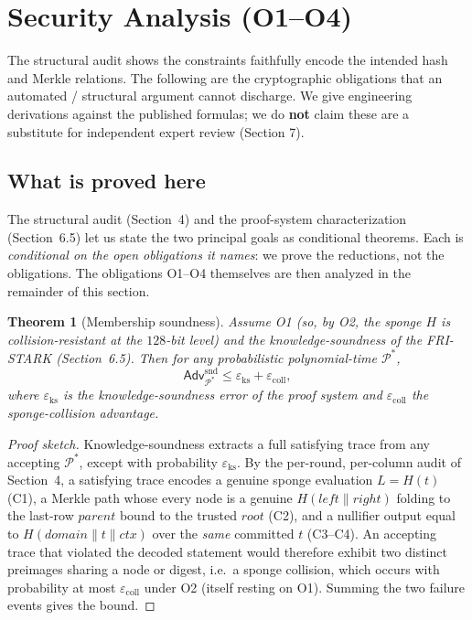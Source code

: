 \documentclass[11pt]{article}
\newcommand{\cat}{\mathbin{\|}}          %
\newcommand{\Adv}{\mathsf{Adv}}
\theoremstyle{plain}
\newtheorem{theorem}{Theorem}
\theoremstyle{definition}
\begin{document}
\section{Security Analysis (O1--O4)}

The structural audit shows the constraints faithfully encode the intended hash and Merkle relations.
The following are the cryptographic obligations that an automated / structural argument cannot
discharge. We give engineering derivations against the published formulas; we do \textbf{not} claim
these are a substitute for independent expert review (Section 7).

\subsection*{What is proved here}

The structural audit (Section~4) and the proof-system characterization (Section~6.5) let us state the
two principal goals as conditional theorems. Each is \emph{conditional on the open obligations it
names}: we prove the reductions, not the obligations. The obligations O1--O4 themselves are then
analyzed in the remainder of this section.

\begin{theorem}[Membership soundness]
Assume O1 (so, by O2, the sponge $H$ is collision-resistant at the $128$-bit level) and the
knowledge-soundness of the FRI-STARK (Section~6.5). Then for any probabilistic polynomial-time
$\mathcal{P}^\ast$,
\[
\Adv^{\mathrm{snd}}_{\mathcal{P}^\ast} \le \varepsilon_{\mathrm{ks}} + \varepsilon_{\mathrm{coll}},
\]
where $\varepsilon_{\mathrm{ks}}$ is the knowledge-soundness error of the proof system and
$\varepsilon_{\mathrm{coll}}$ the sponge-collision advantage.
\end{theorem}

\begin{proof}[Proof sketch]
Knowledge-soundness extracts a full satisfying trace from any accepting $\mathcal{P}^\ast$, except
with probability $\varepsilon_{\mathrm{ks}}$. By the per-round, per-column audit of Section~4, a
satisfying trace encodes a genuine sponge evaluation $L = H(t)$ (C1), a Merkle path whose every node
is a genuine $H(\mathit{left} \cat \mathit{right})$ folding to the last-row $\mathit{parent}$ bound to
the trusted $\mathit{root}$ (C2), and a nullifier output equal to $H(\mathit{domain} \cat t \cat
\mathit{ctx})$ over the \emph{same} committed $t$ (C3--C4). An accepting trace that violated the
decoded statement would therefore exhibit two distinct preimages sharing a node or digest, i.e.\ a
sponge collision, which occurs with probability at most $\varepsilon_{\mathrm{coll}}$ under O2 (itself
resting on O1). Summing the two failure events gives the bound.
\end{proof}
\end{document}
